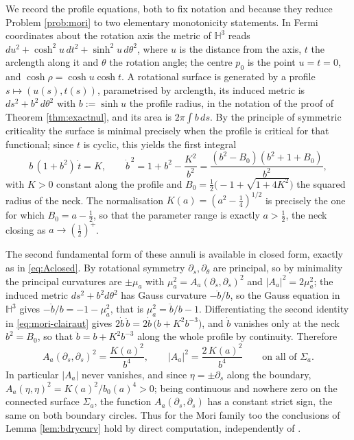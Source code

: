 \documentclass[10pt,a4paper]{amsart}
\newcommand{\Hyp}{\mathbb{H}}
\begin{document}
We record the profile equations, both to fix notation and because they reduce Problem \ref{prob:mori} to two elementary monotonicity statements. In Fermi coordinates about the rotation axis the metric of $\Hyp^3$ reads $du^2+\cosh^2u\,dt^2+\sinh^2u\,d\theta^2$, where $u$ is the distance from the axis, $t$ the arclength along it and $\theta$ the rotation angle; the centre $p_0$ is the point $u=t=0$, and $\cosh\rho=\cosh u\cosh t$. A rotational surface is generated by a profile $s\mapsto(u(s),t(s))$, parametrised by arclength, its induced metric is $ds^2+b^2\,d\theta^2$ with $b:=\sinh u$ the profile radius, in the notation of the proof of Theorem \ref{thm:exactnul}, and its area is $2\pi\int b\,ds$. By the principle of symmetric criticality the surface is minimal precisely when the profile is critical for that functional; since $t$ is cyclic, this yields the first integral
\begin{equation}\label{eq:mori-clairaut}
b\,(1+b^2)\,\dot t=K,\qquad
\dot b^{\,2}=1+b^2-\frac{K^2}{b^2}=\frac{(b^2-B_0)(b^2+1+B_0)}{b^2},
\end{equation}
with $K>0$ constant along the profile and $B_0=\tfrac12\bigl(-1+\sqrt{1+4K^2}\bigr)$ the squared radius of the neck. The normalisation $K(a)=(a^2-\tfrac14)^{1/2}$ is precisely the one for which $B_0=a-\tfrac12$, so that the parameter range is exactly $a>\tfrac12$, the neck closing as $a\to(\tfrac12)^{+}$.

The second fundamental form of these annuli is available in closed form, exactly as in \eqref{eq:Aclosed}. By rotational symmetry $\partial_s,\partial_\theta$ are principal, so by minimality the principal curvatures are $\pm\mu_a$ with $\mu_a^2=A_a(\partial_s,\partial_s)^2$ and $|A_a|^2=2\mu_a^2$; the induced metric $ds^2+b^2d\theta^2$ has Gauss curvature $-\ddot b/b$, so the Gauss equation in $\Hyp^3$ gives $-\ddot b/b=-1-\mu_a^2$, that is $\mu_a^2=\ddot b/b-1$. Differentiating the second identity in \eqref{eq:mori-clairaut} gives $2\dot b\,\ddot b=2\dot b\,\bigl(b+K^2b^{-3}\bigr)$, and $\dot b$ vanishes only at the neck $b^2=B_0$, so that $\ddot b=b+K^2b^{-3}$ along the whole profile by continuity. Therefore
\begin{equation}\label{eq:Aclosed-mori}
A_a(\partial_s,\partial_s)^2=\frac{K(a)^2}{b^4},\qquad |A_a|^2=\frac{2\,K(a)^2}{b^4}\qquad\text{on all of }\Sigma_a .
\end{equation}
In particular $|A_a|$ never vanishes, and since $\eta=\pm\partial_s$ along the boundary, $A_a(\eta,\eta)^2=K(a)^2/b_0(a)^4>0$; being continuous and nowhere zero on the connected surface $\Sigma_a$, the function $A_a(\partial_s,\partial_s)$ has a constant strict sign, the same on both boundary circles. Thus for the Mori family too the conclusions of Lemma \ref{lem:bdrycurv} hold by direct computation, independently of \cite{NZ1}.
\end{document}
